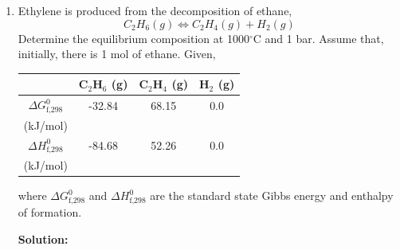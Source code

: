 \documentclass[12pts,a4paper,amsmath,amssymb,floatfix]{article}%
\begin{document}
\begin{enumerate}[1)]

\item\label{Example:2} Ethylene is produced from the decomposition of ethane,
       \begin{displaymath}
          C_{2}H_{6} (g) \Longleftrightarrow C_{2}H_{4} (g) + H_{2} (g) 
       \end{displaymath} 
       Determine the equilibrium composition at 1000$^{\circ}$C and 1 bar. Assume that, initially, there is 1 mol of ethane. Given,
       \begin{center}
           \begin{tabular}{|c c c c|}
           \hline
                                        &  C$_{2}$H$_{6}$ (g) & C$_{2}$H$_{4}$ (g) &  H$_{2}$ (g)  \\ 
           \hline
             $\Delta G^{0}_{\text{f,298}}$  &  -32.84            &  68.15           & 0.0           \\
                   (kJ/mol)             &                    &                  &               \\
           \hline
             $\Delta H^{0}_{\text{f,298}}$  &  -84.68            &  52.26           & 0.0           \\
                   (kJ/mol)             &                    &                  &               \\
           \hline 
           \end{tabular}
       \end{center}
       where $\Delta G^{0}_{\text{f,298}}$ and $\Delta H^{0}_{\text{f,298}}$ are the standard state Gibbs energy and enthalpy of formation. 

\bigskip

{\large{\bf Solution:}}


\end{enumerate}
\end{document}
